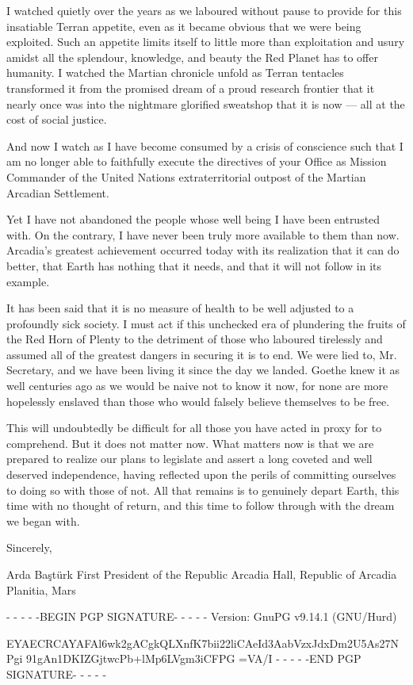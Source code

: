 I watched quietly over the years as we laboured without pause to provide for this insatiable Terran appetite, even as it became obvious that we were being exploited. Such an appetite limits itself to little more than exploitation and usury amidst all the splendour, knowledge, and beauty the Red Planet has to offer humanity. I watched the Martian chronicle unfold as Terran tentacles transformed it from the promised dream of a proud research frontier that it nearly once was into the nightmare glorified sweatshop that it is now — all at the cost of social justice.

And now I watch as I have become consumed by a crisis of conscience such that I am no longer able to faithfully execute the directives of your Office as Mission Commander of the United Nations extraterritorial outpost of the Martian Arcadian Settlement.

Yet I have not abandoned the people whose well being I have been entrusted with. On the contrary, I have never been truly more available to them than now. Arcadia's greatest achievement occurred today with its realization that it can do better, that Earth has nothing that it needs, and that it will not follow in its example. 

It has been said that it is no measure of health to be well adjusted to a profoundly sick society. I must act if this unchecked era of plundering the fruits of the Red Horn of Plenty to the detriment of those who laboured tirelessly and assumed all of the greatest dangers in securing it is to end. We were lied to, Mr. Secretary, and we have been living it since the day we landed. Goethe knew it as well centuries ago as we would be naive not to know it now, for none are more hopelessly enslaved than those who would falsely believe themselves to be free.

This will undoubtedly be difficult for all those you have acted in proxy for to comprehend. But it does not matter now. What matters now is that we are prepared to realize our plans to legislate and assert a long coveted and well deserved independence, having reflected upon the perils of committing ourselves to doing so with those of not. All that remains is to genuinely depart Earth, this time with no thought of return, and this time to follow through with the dream we began with.

Sincerely, 

\hskip 1.5cm 
   
Arda Baştürk
First President of the Republic
Arcadia Hall, Republic of Arcadia Planitia, Mars

- - - - -BEGIN PGP SIGNATURE- - - - -
Version: GnuPG v9.14.1 (GNU/Hurd)

EYAECRCAYAFAl6wk2gACgkQLXnfK7bii22liCAeId3AabVzxJdxDm2U5As27NPgi
91gAn1DKIZGjtwcPb+lMp6LVgm3iCFPG
=VA/I
- - - - -END PGP SIGNATURE- - - - -
\stoplines

